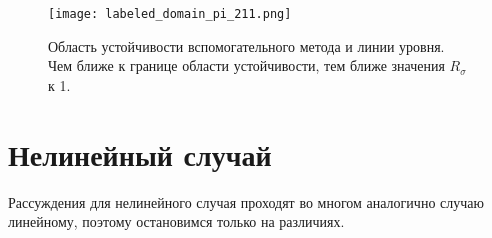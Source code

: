 \documentclass[a4paper, 14pt]{extreport} %
\begin{document}
\begin{figure}[H]
\begin{center}
\texttt{[image: labeled\_domain\_pi\_211.png]}
\caption{\small Область устойчивости вспомогательного метода и линии уровня. Чем ближе к границе области устойчивости, тем ближе значения $R_\sigma$ к 1.}
\label{linii_urovnia}
\end{center}
\end{figure}





\section{Нелинейный случай}

Рассуждения для нелинейного случая проходят во многом аналогично случаю линейному, поэтому остановимся только на различиях.
\end{document}
